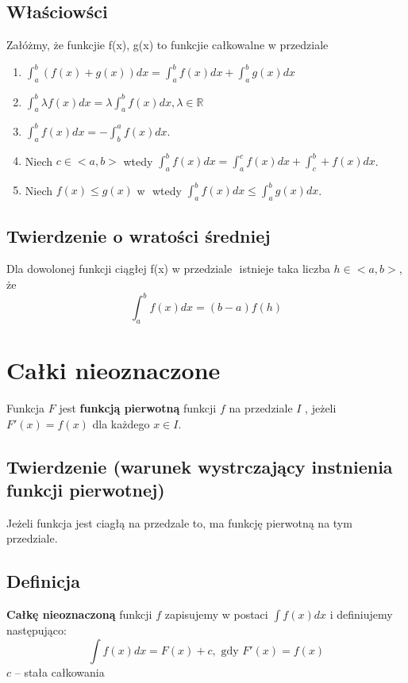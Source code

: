 \documentclass[11pt]{article}
\begin{document}
\subsection{Właściowści}
\label{sec:orgda6ff1c}
Załóżmy, że funkcjie f(x), g(x) to funkcjie całkowalne w przedziale \(<a,b>\)
\begin{enumerate}
\item \(\displaystyle\int_a^b( f(x) + g(x) )dx
   = \int_a^b f(x) dx + \int_a^b g(x)dx\)
\item \(\displaystyle \int_a^b \lambda f(x) dx = \lambda \int_a^b f(x)dx, \lambda \in \mathbb{R}\)
\item \(\displaystyle \int_a^b f(x) dx = - \int_b^a f(x) dx\).
\item Niech \(c \in <a,b>\) wtedy \(\displaystyle \int_a^b f(x)dx = \int_a^c f(x)dx + \int_c^b+f(x)dx\).
\item Niech \(f(x) \le g(x)\) w \(<a, b>\) wtedy \(\displaystyle \int_a^b f(x)dx \le \int_a^b g(x)dx\).
\end{enumerate}
\subsection{Twierdzenie o wratości średniej}
\label{sec:org6dafbb6}
Dla dowolonej funkcji ciągłej f(x) w przedziale \(<a,b>\) istnieje taka liczba \(h \in <a,b>\), że
$$\int_a^b f(x)dx = (b-a)f(h)$$
\newpage
\section{Całki nieoznaczone}
\label{sec:orgb56b439}
Funkcja \(F\) jest \textbf{funkcją pierwotną} funkcji \(f\) na przedziale \(I\) , jeżeli \(F'(x) = f(x)\) dla każdego \(x \in I\).
\subsection{Twierdzenie (warunek wystrczający instnienia funkcji pierwotnej)}
\label{sec:org5cf5d85}
Jeżeli funkcja jest ciagłą na przedzale to, ma funkcję pierwotną na tym przedziale.
\subsection{Definicja}
\label{sec:org033d0ed}
\textbf{Całkę nieoznaczoną} funkcji \(f\) zapisujemy w postaci \(\int f(x)dx\) i definiujemy następująco:
$$\int f(x) dx = F(x) + c, \text{ gdy }F'(x) = f(x)$$
\(c\) -- stała całkowania
\end{document}
